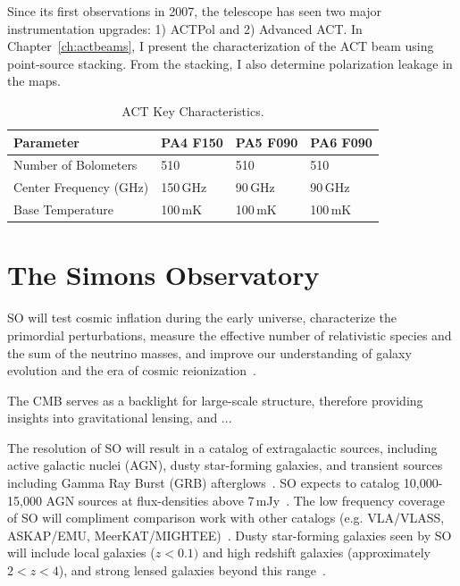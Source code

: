 Since its first observations in 2007, the telescope has seen two major instrumentation upgrades: 1) ACTPol and 2) Advanced ACT.  In Chapter~\ref{ch:actbeams}, I present the characterization of the ACT beam using point-source stacking.  From the stacking, I also determine polarization leakage in the maps.

\begin{table}[t]
    \centering
    \begin{tabular}{|l|l|l|l|} \hline
        \textbf{ Parameter} &  \textbf{PA4 F150} &  \textbf{PA5 F090}  &  \textbf{PA6 F090}  \\ \hline \hline
        Number of Bolometers & 510 & 510 & 510\\\hline
        Center Frequency (GHz) & 150\,GHz & 90\,GHz & 90\,GHz\\\hline
        Base Temperature & 100\,mK & 100\,mK & 100\,mK\\\hline
    \end{tabular} \caption{ACT Key Characteristics.}
    \label{tab:act}
\end{table}

\section{The Simons Observatory}

SO will test cosmic inflation during the early universe, characterize the primordial perturbations, measure the effective number of relativistic species and the sum of the neutrino masses, and improve our understanding of galaxy evolution and the era of cosmic reionization~\citep{so19,so_science}. 

The CMB serves as a backlight for large-scale structure, therefore providing insights into gravitational lensing, and ...

The resolution of SO will result in a catalog of extragalactic sources, including active galactic nuclei (AGN), dusty star-forming galaxies, and transient sources including Gamma Ray Burst (GRB) afterglows~\cite{so_science}.  SO expects to catalog 10,000-15,000 AGN sources at flux-densities above 7\,mJy~\cite{Tucci_2011}.  The low frequency coverage of SO will compliment comparison work with other catalogs (e.g. VLA/VLASS, ASKAP/EMU, MeerKAT/MIGHTEE)~\cite{so_science}.  Dusty star-forming galaxies seen by SO will include local galaxies ($z<0.1)$ and high redshift galaxies (approximately $2<z<4$), and strong lensed galaxies beyond this range~\cite{Marrone_2017}.

